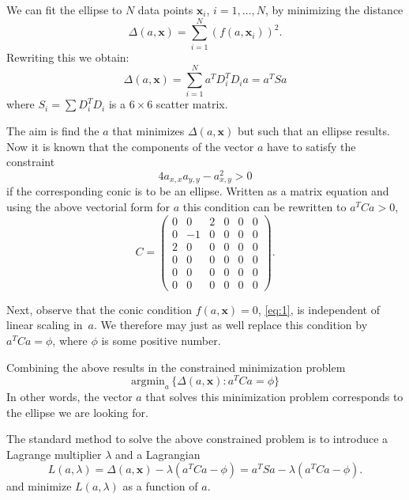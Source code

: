\documentclass[a4paper,11pt]{article}
\begin{document}
We can fit the ellipse to $N$ data points $\mathbf{x}_i$, $i=1,\ldots,N$, by minimizing the distance
\begin{equation*}
\Delta(a,\mathbf{x}) = \sum_{i=1}^N (f(a,\mathbf{x}_i))^2.
\end{equation*}
Rewriting this we obtain:
\begin{equation*}
\Delta(a,\mathbf{x}) = \sum_{i=1}^N a^T D_i^T D_i a = a^T S a
\end{equation*}
where $S_i = \sum D_i^T D_i$ is a  $6\times 6$ scatter matrix.

The aim is find the $a$ that minimizes $\Delta(a,\mathbf{x})$ but such that an ellipse results.
Now it is known that the components of the vector $a$ have to satisfy the constraint
\begin{equation*}
4a_{x,x}a_{y,y} - a^2_{x,y} > 0
\end{equation*}
if the corresponding conic is to be an ellipse.
Written as a matrix equation and using the above vectorial form for $a$ this condition can be rewritten to $a^T C a >0$,
\begin{equation*}
  C =
  \begin{pmatrix}
    0 & 0 & 2 & 0 & 0 & 0 \\
    0 & -1 & 0 & 0 & 0 & 0 \\
    2 & 0 & 0 & 0 & 0 & 0 \\
    0 & 0 & 0 & 0 & 0 & 0 \\
    0 & 0 & 0 & 0 & 0 & 0 \\
    0 & 0 & 0 & 0 & 0 & 0 
  \end{pmatrix}.
\end{equation*}

Next, observe that the conic condition $f(a,\mathbf{x}) = 0$, \cref{eq:1}, is independent of linear scaling in~$a$.
We therefore may just as well replace this condition by $a^T C a = \phi$, where $\phi$ is some positive number.

Combining the above results in the constrained minimization problem
\begin{equation*}
\mathrm{argmin}_a\, \{ \Delta(a, \mathbf{x}) : a^T C a = \phi\}
\end{equation*}
In other words, the vector $a$ that solves this minimization problem corresponds to the ellipse we are looking for.


The standard method to solve the above constrained problem is to introduce a Lagrange multiplier $\lambda$ and a Lagrangian
\begin{equation*}
L(a, \lambda) = \Delta(a, \mathbf{x}) - \lambda (a^T C a -\phi) = a^T S a - \lambda (a^T C a - \phi).
\end{equation*}
and minimize $L(a, \lambda)$ as a function of $a$.
\end{document}
